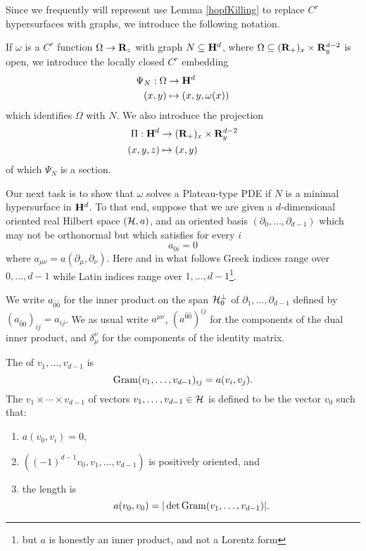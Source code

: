 Since we frequently will represent use Lemma \ref{hopfKilling} to replace $C^r$ hypersurfaces with graphs, we introduce the following notation.

\begin{notation}\label{hyperbolic line bundle}
    If $\omega$ is a $C^r$ function $\Omega \to \mathbf{R}_z$ with graph $N \subseteq \mathbf H^d$, where $\Omega \subseteq (\mathbf{R}_+)_x \times \mathbf{R}^{d - 2}_y$ is open, we introduce the locally closed $C^r$ embedding
    \begin{align*}
        \Psi_N: \Omega &\to \mathbf H^d \\
        (x, y) &\mapsto (x, y, \omega(x))
    \end{align*}
    which identifies $\Omega$ with $N$.
    We also introduce the projection
    \begin{align*}
        \Pi: \mathbf H^d &\to (\mathbf{R}_+)_x \times \mathbf{R}^{d - 2}_y\\
        (x, y, z) &\mapsto (x, y)
    \end{align*}
    of which $\Psi_N$ is a section.
\end{notation}

Our next task is to show that $\omega$ solves a Plateau-type PDE if $N$ is a minimal hypersurface in $\mathbf H^d$.
To that end, suppose that we are given a $d$-dimensional oriented real Hilbert space $(\mathcal H, a)$, and an oriented basis $(\partial_0, \dots, \partial_{d - 1})$ which may not be orthonormal but which satisfies for every $i$
\begin{equation}\label{0th coordinate orthogonal}
a_{0i} = 0
\end{equation}
where $a_{\mu\nu} = a(\partial_\mu, \partial_\nu)$.
Here and in what follows Greek indices range over $0, \dots, d - 1$ while Latin indices range over $1, \dots, d - 1$\footnote{but $a$ is honestly an inner product, and not a Lorentz form}.

We write $a_{\hat 0 \hat 0}$ for the inner product on the span $\mathcal H_0^\perp$ of $\partial_1, \dots, \partial_{d - 1}$ defined by $(a_{\hat 0 \hat 0})_{ij} = a_{ij}$.
We as usual write $a^{\mu\nu}$, $(a^{\hat 0 \hat 0})^{ij}$ for the components of the dual inner product, and $\delta_\mu^\nu$ for the components of the identity matrix.

\begin{definition}
The  of $v_1, \dots, v_{d - 1}$ is
$$\operatorname{Gram}(v_1, \dots, v_{d - 1})_{ij} = a(v_i, v_j).$$
The  $v_1 \times \cdots \times v_{d - 1}$ of vectors $v_1, \dots, v_{d - 1} \in \mathcal H$ is defined to be the vector $v_0$
such that:
\begin{enumerate}
\item $a(v_0, v_i) = 0$,
\item $((-1)^{d - 1} v_0, v_1, \dots, v_{d - 1})$ is positively oriented, and
\item the length is
$$a(v_0, v_0) = |\det \operatorname{Gram}(v_1, \dots, v_{d - 1})|.$$
\end{enumerate}
\end{definition}

